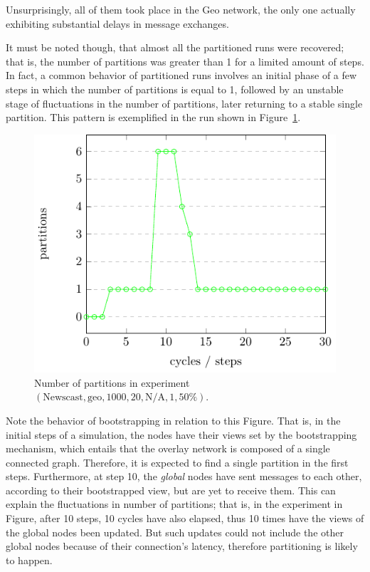\documentclass[a4paper]{ifacconf}
\begin{document}
Unsurprisingly, all of them took place in the Geo network, the only one actually exhibiting substantial delays in message exchanges.

It must be noted though, that almost all the partitioned runs were recovered; that is, the number of partitions was greater than 1 for a limited amount of steps.
In fact, a common behavior of partitioned runs involves an initial phase of a few steps in which the number of partitions is equal to 1, followed by an unstable stage of fluctuations in the number of partitions, later returning to a stable single partition.
This pattern is exemplified in the run shown in Figure~\ref{fig:recovered-run}.

\begin{figure}
    \centering
    \includegraphics[width=.7\linewidth]{"figures/recovered run"}
    \caption{Number of partitions in experiment $(\text{Newscast}, \text{geo}, 1000, 20, \text{N/A}, 1, 50\%)$.}
    \label{fig:recovered-run}
\end{figure}

Note the behavior of bootstrapping in relation to this Figure.
That is, in the initial steps of a simulation, the nodes have their views set by the bootstrapping mechanism, which entails that the overlay network is composed of a single connected graph.
Therefore, it is expected to find a single partition in the first steps.
Furthermore, at step 10, the \emph{global} nodes have sent messages to each other, according to their bootstrapped view, but are yet to receive them.
This can explain the fluctuations in number of partitions; that is, in the experiment in Figure, after 10 steps, 10 cycles have also elapsed, thus 10 times have the views of the global nodes been updated.
But such updates could not include the other global nodes because of their connection's latency, therefore partitioning is likely to happen.
\end{document}
